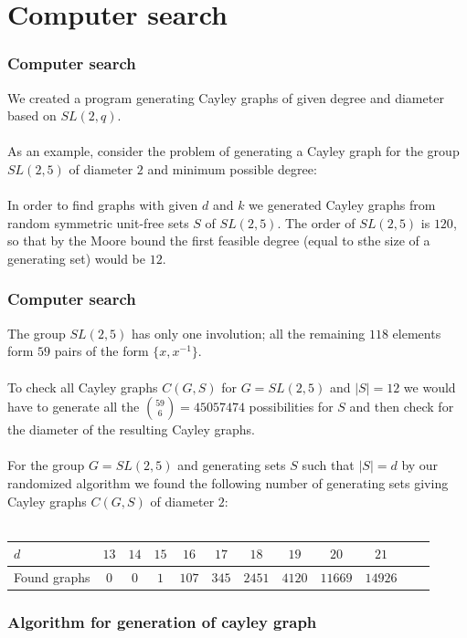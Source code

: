 \documentclass{beamer}
\begin{document}
\section{Computer search} 
\begin{frame}
	\frametitle{Computer search}
	We created a program generating Cayley graphs of given degree and diameter based on $SL(2,q)$. \\~\\
	As an example, consider the problem of generating a Cayley graph for the group $SL(2,5)$ of diameter $2$ and minimum possible degree: \\~\\

	In order to find graphs with given $d$ and $k$ we generated Cayley graphs from random symmetric unit-free sets $S$ of $SL(2,5)$.
	The order of $SL(2,5)$ is $120$, so that by the Moore bound the first feasible degree (equal to sthe size of a generating set) would be $12$.
\end{frame}
\begin{frame}
	\frametitle{Computer search}
	 The group $SL(2,5)$ has only one involution; all the remaining $118$ elements form $59$ pairs of the form $\{x,x^{-1}\}$. \\~\\
	 To check all Cayley graphs $C(G,S)$ for $G=SL(2,5)$ and $|S|=12$ we would have to generate all the ${59 \choose 6} = 45057474$ possibilities for $S$ and then check for the diameter of the resulting Cayley graphs. \\~\\
	For the group $G=SL(2,5)$ and generating sets $S$ such that $|S|=d$ by our randomized algorithm we found the following number of generating sets giving Cayley graphs $C(G,S)$ of diameter $2$: \\~\\
	\begin{tabular}[htbp]{l*{10}{c}r}
		$d$ & $13$ & $14$ & $15$ & $16$ & $17$ & $18$ & $19$ & $20$ & $21$ \\
		\hline
 		Found graphs & $0$  & $0$ & $1$ & $107$ & $345$ & $2451$  & $4120$ & $11669$ & $14926$ \\
	\end{tabular} 
\end{frame}
\begin{frame}
	\frametitle{Algorithm for generation of cayley graph}
	
\end{frame}
\end{document}
